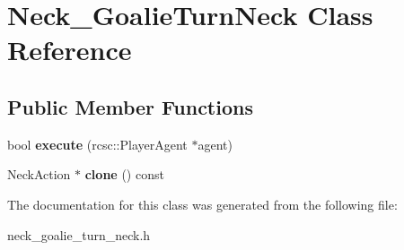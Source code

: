 \hypertarget{classNeck__GoalieTurnNeck}{
\section{Neck\_\-GoalieTurnNeck Class Reference}
\label{classNeck__GoalieTurnNeck}
}
\subsection*{Public Member Functions}
\begin{DoxyCompactItemize}
\item 
\hypertarget{classNeck__GoalieTurnNeck_acb48359a6b0d48255fb8e40fd59494cc}{
bool {\bfseries execute} (rcsc::PlayerAgent $\ast$agent)}
\label{classNeck__GoalieTurnNeck_acb48359a6b0d48255fb8e40fd59494cc}

\item 
\hypertarget{classNeck__GoalieTurnNeck_a062bb13065ba58dd0502ea07bd9666d3}{
NeckAction $\ast$ {\bfseries clone} () const }
\label{classNeck__GoalieTurnNeck_a062bb13065ba58dd0502ea07bd9666d3}

\end{DoxyCompactItemize}


The documentation for this class was generated from the following file:\begin{DoxyCompactItemize}
\item 
neck\_\-goalie\_\-turn\_\-neck.h\end{DoxyCompactItemize}
